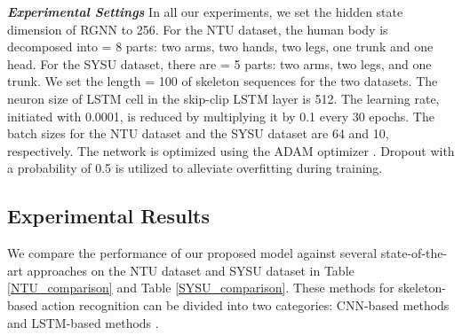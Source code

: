 \documentclass[runningheads]{llncs}
\begin{document}
\textbf{\emph{Experimental Settings}} \hspace{3mm}
In all our experiments, we set the hidden state dimension of RGNN to 256. For the NTU dataset, the human body is decomposed into  = 8 parts: two arms, two hands, two legs, one trunk and one head. For the SYSU dataset, there are  = 5 parts: two arms, two legs, and one trunk. We set the length  = 100 of skeleton sequences for the two datasets. The neuron size of LSTM cell in the skip-clip LSTM layer is 512. The learning rate, initiated with 0.0001, is reduced by multiplying it by 0.1 every 30 epochs. The batch sizes for the NTU dataset and the SYSU dataset are 64 and 10, respectively. The network is optimized using the ADAM optimizer \cite{kingma2015adam}. Dropout with a probability of 0.5 is utilized to alleviate overfitting during training.

\subsection{Experimental Results}

We compare the performance of our proposed model against several state-of-the-art approaches on the NTU dataset and SYSU dataset in Table \ref{NTU_comparison} and Table \ref{SYSU_comparison}. These methods for skeleton-based action recognition can be divided into two categories: CNN-based methods \cite{liu2017enhanced,Yan2018Spatial} and LSTM-based methods \cite{Zhang2017View,Inwoong2017Ensemble,Song2017Attention}.
\end{document}

